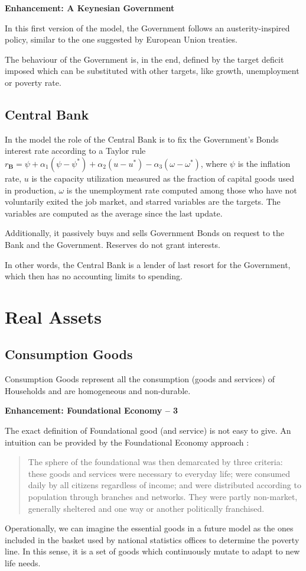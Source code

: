 \documentclass[a4paper, headings=standardclasses]{scrartcl}
\newenvironment{enh}[1][]{\begin{framed}\noindent\textbf{Enhancement: #1}\par}{\end{framed}}
\begin{document}
\begin{enh}[A Keynesian Government]
	In this first version of the model, the Government follows an austerity-inspired policy, similar to the one suggested by European Union treaties.

	The behaviour of the Government is, in the end, defined by the target deficit imposed which can be substituted with other targets, like growth, unemployment or poverty rate.
\end{enh}

\subsection{Central Bank}
In the model the role of the Central Bank is to fix the Government's Bonds interest rate according to a Taylor rule ${r_\mathbf{B}} = \psi + \alpha_1 (\psi - \psi^*) + \alpha_2 (u - u^*) - \alpha_3 (\omega - \omega^*)$, where $\psi$ is the inflation rate, $u$ is the capacity utilization measured as the fraction of capital goods used in production, $\omega$ is the unemployment rate computed among those who have not voluntarily exited the job market, and starred variables are the targets. The variables are computed as the average since the last update.

Additionally, it passively buys and sells Government Bonds on request to the Bank and the Government. Reserves do not grant interests.

In other words, the Central Bank is a lender of last resort for the Government, which then has no accounting limits to spending.

\section{Real Assets}
\subsection{Consumption Goods}
Consumption Goods represent all the consumption (goods and services) of Households and are homogeneous and non-durable.

\begin{enh}[Foundational Economy -- 3]
	The exact definition of Foundational good (and service) is not easy to give. An intuition can be provided by the Foundational Economy approach \parencite{arcidiacono2018}: \begin{quote}
		The sphere of the foundational was then demarcated by three criteria: these goods and services were necessary to everyday life; were consumed daily by all citizens regardless of income; and were distributed according to population through branches and networks. They were partly non-market, generally sheltered and one way or another politically franchised.
	\end{quote}

	Operationally, we can imagine the essential goods in a future model as the ones included in the basket used by national statistics offices to determine the poverty line. In this sense, it is a set of goods which continuously mutate to adapt to new life needs.
\end{enh}
\end{document}
